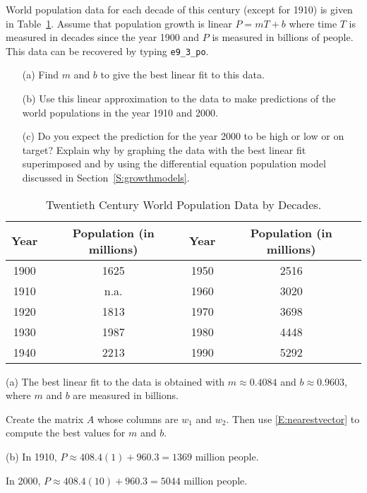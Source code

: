 \documentclass{ximera}
\begin{document}
\begin{computerExercise} \label{c7.6.1}
World population data for each decade of this century (except for 1910)
is given in Table~\ref{T:popdata}.  Assume that population growth is linear
$P=mT+b$ where time $T$ is measured in decades since the year 1900 and $P$ is
measured in billions of people.  This data can be recovered by typing
{\tt e9\_3\_po}.
\begin{itemize}
\item[(a)]  Find $m$ and $b$ to give the best linear fit to this data.
\item[(b)]  Use this linear approximation to the data to make predictions
of the world populations in the year 1910 and 2000.
\item[(c)]  Do you expect the prediction for the year 2000 to be high or low
or on target? Explain why by graphing the data with the best linear fit
superimposed and by using the differential equation population model
discussed in Section~\ref{S:growthmodels}.
\end{itemize}
\begin{table}[htb]
\begin{center}
\begin{tabular}{|c|c||c|c|}
\hline
Year & Population (in millions) & Year & Population (in millions)\\
\hline
1900 & 1625 & 1950 & 2516  \\
1910 & n.a. & 1960 & 3020 \\
1920 & 1813 & 1970 & 3698 \\
1930 & 1987 & 1980 & 4448 \\
1940 & 2213 & 1990 & 5292 \\
\hline
\end{tabular}
\caption{Twentieth Century World Population Data by Decades.}
\label{T:popdata}
\end{center}
\end{table}


\begin{solution}

(a) \ans The best linear fit to the data is obtained with $m \approx
0.4084$ and $b \approx 0.9603$, where $m$ and $b$ are measured in
billions.

\soln Create the matrix $A$ whose columns are $w_1$ and $w_2$.  Then use
\eqref{E:nearestvector} to compute the best values for $m$ and $b$.

(b) In 1910, $P \approx 408.4(1) + 960.3 = 1369$ million people.

\para In 2000, $P \approx 408.4(10) + 960.3 = 5044$ million people.


\end{solution}
\end{computerExercise}
\end{document}
